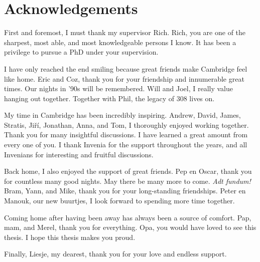 \documentclass[12pt]{report}
\begin{document}
\chapter*{Acknowledgements}

First and foremost, I must thank my supervisor Rich.
Rich, you are one of the sharpest, most able, and most knowledgeable persons I know.
It has been a privilege to pursue a PhD under your supervision.

I have only reached the end smiling
because great friends make
Cambridge feel like home.
Eric and Coz, thank you for your friendship and
innumerable great times.
Our nights in '90s will be remembered.
Will and Joel, I really value hanging out together.
Together with Phil, the legacy of 308 lives on.

My time in Cambridge has been incredibly inspiring.
Andrew, David,
James, Stratis,
Ji\v{r}\'{i},
Jonathan,
Anna,
and Tom,
I thoroughly enjoyed working together.
Thank you for many insightful discussions.
I have learned a great amount from every one of you.
I thank Invenia for the support throughout the years,
and all Invenians for interesting and fruitful discussions.

Back home, I also enjoyed the support of great friends.
Pep en Oscar, thank you for countless many good nights.
May there be many more to come.
\textit{Adt fundum!}
Bram,
Yann, and Mike,
thank you for your long-standing friendships.
Peter en Manouk, our new buurtjes,
I look forward to spending more time together.

Coming home after having been away has always been a source of comfort.
Pap, mam, and Merel, thank you for everything.
Opa,
you would have loved to see this thesis.
I hope this thesis makes you proud.

Finally, Liesje, my dearest, thank you for your love and endless support.
\end{document}
